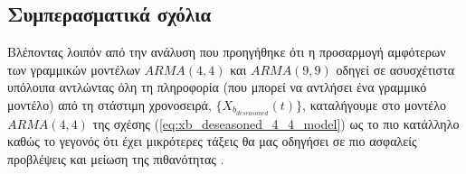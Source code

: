 \subsection{Συμπερασματικά σχόλια}

Βλέποντας λοιπόν από την ανάλυση που προηγήθηκε ότι η προσαρμογή αμφότερων των γραμμικών μοντέλων $ARMA(4,4)$ και $ARMA(9,9)$ οδηγεί σε ασυσχέτιστα υπόλοιπα αντλώντας όλη τη πληροφορία (που μπορεί να αντλήσει ένα γραμμικό μοντέλο) από τη στάστιμη χρονοσειρά, $\{X_{b_{deseasoned}}(t)\}$, καταλήγουμε στο μοντέλο $ARMA(4,4)$ της σχέσης (\ref{eq:xb_deseasoned_4_4_model}) ως το πιο κατάλληλο καθώς το γεγονός ότι έχει μικρότερες τάξεις θα μας οδηγήσει σε πιο ασφαλείς προβλέψεις και μείωση της πιθανότητας .